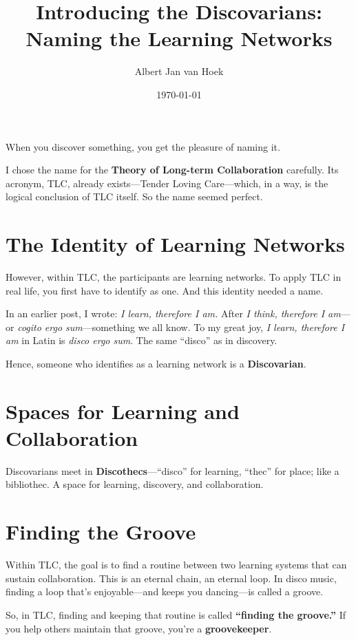 \documentclass{article}
\title{Introducing the Discovarians: Naming the Learning Networks}
\author{Albert Jan van Hoek}
\date{\today}
\begin{document}
\maketitle

When you discover something, you get the pleasure of naming it.

I chose the name for the \textbf{Theory of Long-term Collaboration} carefully. Its acronym, TLC, already exists—Tender Loving Care—which, in a way, is the logical conclusion of TLC itself. So the name seemed perfect.

\section*{The Identity of Learning Networks}

However, within TLC, the participants are learning networks. To apply TLC in real life, you first have to identify as one. And this identity needed a name.

In an earlier post, I wrote: \textit{I learn, therefore I am.}
After \textit{I think, therefore I am}—or \textit{cogito ergo sum}—something we all know.
To my great joy, \textit{I learn, therefore I am} in Latin is \textit{disco ergo sum}. The same ``disco'' as in discovery.

Hence, someone who identifies as a learning network is a \textbf{Discovarian}.

\section*{Spaces for Learning and Collaboration}

Discovarians meet in \textbf{Discothecs}—``disco'' for learning, ``thec'' for place; like a bibliothec. A space for learning, discovery, and collaboration.

\section*{Finding the Groove}

Within TLC, the goal is to find a routine between two learning systems that can sustain collaboration. This is an eternal chain, an eternal loop. In disco music, finding a loop that’s enjoyable—and keeps you dancing—is called a groove.

So, in TLC, finding and keeping that routine is called \textbf{``finding the groove.''} If you help others maintain that groove, you’re a \textbf{groovekeeper}.
\end{document}
